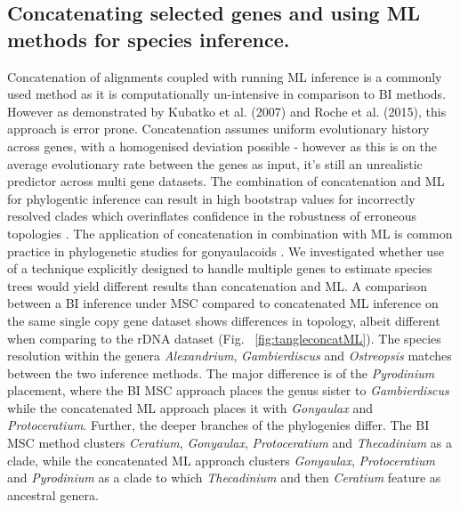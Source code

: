 \documentclass[12pt]{article}
\begin{document}
\subsection*{Concatenating selected genes and using ML methods for species inference.}
\FloatBarrier
Concatenation of alignments coupled with running ML inference is a commonly used method as it is computationally un-intensive in comparison to BI methods. 
However as demonstrated by Kubatko et al. (2007) and Roche et al. (2015), this approach is error prone. 
Concatenation assumes uniform evolutionary history across genes, with a homogenised deviation possible - however as this is on the average evolutionary rate between the genes as input, it's still an unrealistic predictor across multi gene datasets. 
The combination of concatenation and ML for phylogentic inference can result in high bootstrap values for incorrectly resolved clades which overinflates confidence in the robustness of erroneous topologies \cite{degnan2009gene}. 
The application of concatenation in combination with ML is common practice in phylogenetic studies for gonyaulacoids  \cite{shalchian2006combined,zhang2007three,saldarriaga2004molecular,murray2005improving,hoppenrath2010dinoflagellate}.
We investigated whether use of a technique explicitly designed to handle multiple genes to estimate species trees would yield different results than concatenation and ML. 
A comparison between a BI inference under MSC compared to concatenated ML inference on the same single copy gene dataset shows differences in topology, albeit different when comparing to the rDNA dataset (Fig. ~\ref{fig:tangleconcatML}). 
The species resolution within the genera \emph{Alexandrium}, \emph{Gambierdiscus} and \emph{Ostreopsis} matches between the two inference methods. 
The major difference is of the \emph{Pyrodinium} placement, where the BI MSC approach places the genus sister to \emph{Gambierdiscus} while the concatenated ML approach places it with \emph{Gonyaulax} and \emph{Protoceratium}. 
Further, the deeper branches of the phylogenies differ. 
The BI MSC method clusters \emph{Ceratium}, \emph{Gonyaulax}, \emph{Protoceratium} and \emph{Thecadinium} as a clade, while the concatenated ML approach clusters \emph{Gonyaulax}, \emph{Protoceratium} and \emph{Pyrodinium} as a clade to which \emph{Thecadinium} and then \emph{Ceratium} feature as ancestral genera. 
\end{document}
